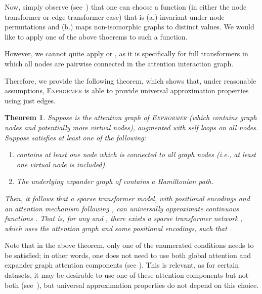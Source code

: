 \documentclass{article}
\theoremstyle{plain}
\newtheorem{theorem}{Theorem}[section]
\theoremstyle{definition}
\theoremstyle{remark}
\begin{document}
Now, simply observe (see~\citealt{kreuzer2021rethinking}) that one can choose a function (in either the node transformer or edge transformer case) that is (a.) invariant under node permutations and (b.) maps non-isomorphic graphs to distinct values. We would like to apply one of the above thoerems to such a function.

However, we cannot quite apply  or , as it is specifically for full transformers in which all nodes are pairwise connected in the attention interaction graph.

Therefore, we provide the following theorem, which shows that, under reasonable assumptions, \textsc{Exphormer} is able to provide universal approximation properties using just  edges.

\begin{theorem}\label{thm:univapprox}
 Suppose  is the attention graph of \textsc{Exphormer} (which contains  graph nodes and potentially more virtual nodes), augmented with self loops on all nodes. Suppose  satisfies at least one of the following:
 \begin{enumerate}
     \item  contains at least one node which is connected to all  graph nodes (i.e., at least one virtual node is included).
     \item The underlying expander graph of  contains a Hamiltonian path.
 \end{enumerate}
 Then, it follows that a sparse transformer model, with positional encodings and an attention mechanism following , can universally approximate continuous functions . That is, for any  and , there exists a sparse transformer network , which uses the attention graph  and some positional encodings, such that .
\end{theorem}
Note that in the above theorem, only one of the enumerated conditions needs to be satisfied; in other words, one does not need to use both global attention and expander graph attention components (see ). This is relevant, as for certain datasets, it may be desirable to use one of these attention components but not both (see~), but universal approximation properties do not depend on this choice.
\end{document}
